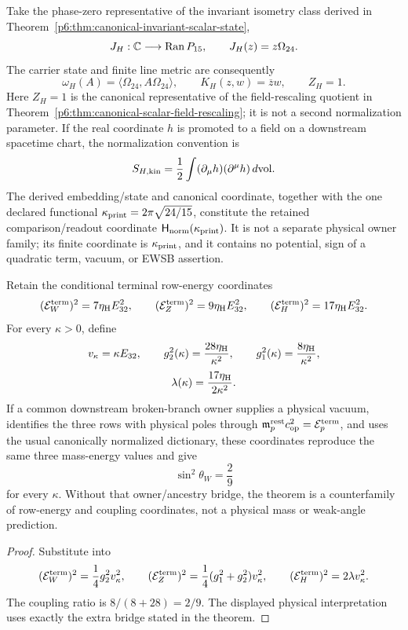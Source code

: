 \documentclass[11pt,a4paper]{article}
\newcommand{\Ran}{\operatorname{Ran}}
\newcommand{\etaH}{\eta_{\rm H}}
\begin{document}
\begin{definition}
\label{p6:def:explicit-hnorm}
Take the phase-zero representative of the invariant isometry class derived in
Theorem~\ref{p6:thm:canonical-invariant-scalar-state},
\[
J_H:\CC\longrightarrow\Ran P_{15},
\qquad
J_H(z)=z\Omega_{24}.
\]
The carrier state and finite line metric are consequently
\[
\omega_H(A)=\langle\Omega_{24},A\Omega_{24}\rangle,
\qquad
K_H(z,w)=\overline zw,
\qquad
Z_H=1.
\]
Here \(Z_H=1\) is the canonical representative of the field-rescaling quotient
in Theorem~\ref{p6:thm:canonical-scalar-field-rescaling}; it is not a second
normalization parameter.
If the real coordinate \(h\) is promoted to a field on a downstream
spacetime chart, the normalization convention is
\[
S_{H,{\rm kin}}
=
\frac12\int(\partial_\mu h)(\partial^\mu h)\,d{\rm vol}.
\]
The derived embedding/state and canonical coordinate, together with the one
declared functional
\(
\kappa_{\rm print}=2\pi\sqrt{24/15}
\),
constitute the retained comparison/readout coordinate
\(\mathsf H_{\rm norm}(\kappa_{\rm print})\).  It is not a separate physical owner family; its finite coordinate is \(\kappa_{\rm print}\), and it contains no potential, sign of a quadratic term, vacuum, or EWSB assertion.
\end{definition}

\begin{theorem}
\label{p6:thm:scalar-counterfamily}
Retain the conditional terminal row-energy coordinates
\[
(\mathcal E_W^{\rm term})^2=7\etaH E_{32}^2,\qquad
(\mathcal E_Z^{\rm term})^2=9\etaH E_{32}^2,\qquad
(\mathcal E_H^{\rm term})^2=17\etaH E_{32}^2.
\]
For every \(\kappa>0\), define
\[
v_\kappa=\kappa E_{32},\qquad
g_2^2(\kappa)=\frac{28\etaH}{\kappa^2},\qquad
g_1^2(\kappa)=\frac{8\etaH}{\kappa^2},
\]
\[
\lambda(\kappa)=\frac{17\etaH}{2\kappa^2}.
\]
If a common downstream broken-branch owner supplies a physical vacuum,
identifies the three rows with physical poles through
\(\mathfrak m_p^{\rm rest}c_{\rm op}^2=\mathcal E_p^{\rm term}\), and uses
the usual canonically normalized dictionary, these coordinates reproduce the
same three mass-energy values and give
\[
\sin^2\theta_W=\frac29
\]
for every \(\kappa\).  Without that owner/ancestry bridge, the theorem is a
counterfamily of row-energy and coupling coordinates, not a physical mass or
weak-angle prediction.
\end{theorem}

\begin{proof}
Substitute into
\[
(\mathcal E_W^{\rm term})^2=\frac14g_2^2v_\kappa^2,\qquad
(\mathcal E_Z^{\rm term})^2=\frac14(g_1^2+g_2^2)v_\kappa^2,\qquad
(\mathcal E_H^{\rm term})^2=2\lambda v_\kappa^2.
\]
The coupling ratio is \(8/(8+28)=2/9\).  The displayed physical
interpretation uses exactly the extra bridge stated in the theorem.
\end{proof}
\end{document}
